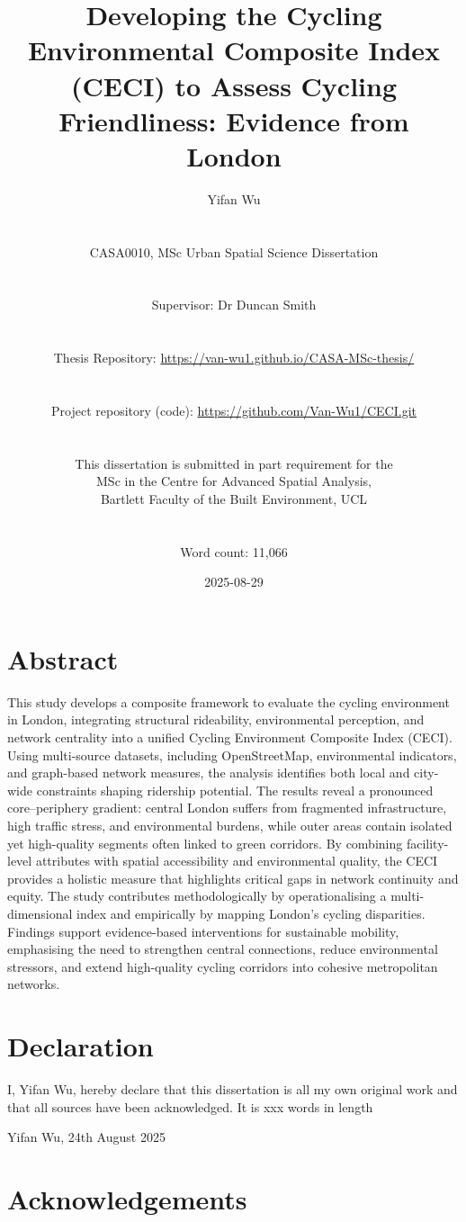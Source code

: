 \documentclass[
  12pt,
  oneside]{book}
\title{Developing the Cycling Environmental Composite Index (CECI) to Assess Cycling Friendliness: Evidence from London}
\author{Yifan Wu\\
\strut \\
CASA0010, MSc Urban Spatial Science Dissertation\\
\strut \\
Supervisor: Dr Duncan Smith\\
\strut \\
Thesis Repository: \url{https://van-wu1.github.io/CASA-MSc-thesis/}\\
\strut \\
Project repository (code): \url{https://github.com/Van-Wu1/CECI.git}\\
\strut \\
This dissertation is submitted in part requirement for the\\
MSc in the Centre for Advanced Spatial Analysis,\\
Bartlett Faculty of the Built Environment, UCL\\
\strut \\
Word count: 11,066}
\date{2025-08-29}
\begin{document}
\maketitle


\chapter*{Abstract}\label{abstract}

This study develops a composite framework to evaluate the cycling environment in London, integrating structural rideability, environmental perception, and network centrality into a unified Cycling Environment Composite Index (CECI). Using multi-source datasets, including OpenStreetMap, environmental indicators, and graph-based network measures, the analysis identifies both local and city-wide constraints shaping ridership potential. The results reveal a pronounced core--periphery gradient: central London suffers from fragmented infrastructure, high traffic stress, and environmental burdens, while outer areas contain isolated yet high-quality segments often linked to green corridors. By combining facility-level attributes with spatial accessibility and environmental quality, the CECI provides a holistic measure that highlights critical gaps in network continuity and equity. The study contributes methodologically by operationalising a multi-dimensional index and empirically by mapping London's cycling disparities. Findings support evidence-based interventions for sustainable mobility, emphasising the need to strengthen central connections, reduce environmental stressors, and extend high-quality cycling corridors into cohesive metropolitan networks.


\chapter*{Declaration}\label{declaration}

I, Yifan Wu, hereby declare that this dissertation is all my own original work and that all sources have been acknowledged. It is xxx words in length

Yifan Wu, 24th August 2025

\chapter*{Acknowledgements}\label{acknowledgements}
\end{document}
